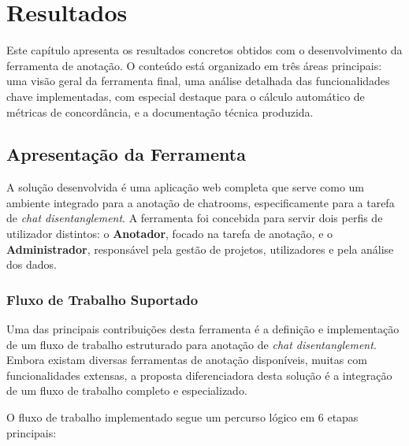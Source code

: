 \chapter{Resultados}
\label{cha:resultados}

Este capítulo apresenta os resultados concretos obtidos com o desenvolvimento da ferramenta de anotação. O conteúdo está organizado em três áreas principais: uma visão geral da ferramenta final, uma análise detalhada das funcionalidades chave implementadas, com especial destaque para o cálculo automático de métricas de concordância, e a documentação técnica produzida.

\section{Apresentação da Ferramenta}

A solução desenvolvida é uma aplicação web completa que serve como um ambiente integrado para a anotação de chatrooms, especificamente para a tarefa de \textit{chat disentanglement}. A ferramenta foi concebida para servir dois perfis de utilizador distintos: o \textbf{Anotador}, focado na tarefa de anotação, e o \textbf{Administrador}, responsável pela gestão de projetos, utilizadores e pela análise dos dados.

\subsection{Fluxo de Trabalho Suportado}

Uma das principais contribuições desta ferramenta é a definição e implementação de um fluxo de trabalho estruturado para anotação de \textit{chat disentanglement}. Embora existam diversas ferramentas de anotação disponíveis, muitas com funcionalidades extensas, a proposta diferenciadora desta solução é a integração de um fluxo de trabalho completo e especializado.

O fluxo de trabalho implementado segue um percurso lógico em 6 etapas principais:

